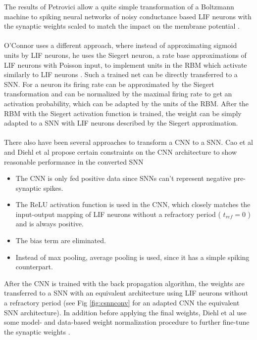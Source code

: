 The results of Petrovici allow a quite simple transformation of a Boltzmann machine to spiking neural networks of noisy conductance based LIF neurons with the synaptic weights scaled to match the impact on the membrane potential \cite{Petrovici2016}.
\\
\\
O'Connor uses a different approach, where instead of approximating sigmoid units by LIF neurons, he uses the Siegert neuron, a rate base approximations of LIF neurons with Poisson input, to implement units in the RBM which activate similarly to LIF neurons \cite{OConnor2013}. 
Such a trained net can be directly transferred to a SNN.
For a neuron its firing rate can be approximated by the Siegert transformation and can be normalized by the maximal firing rate to get an activation probability, which can be adapted by the units of the RBM. 
After the RBM with the Siegert activation function is trained, the weight can be simply adapted to a SNN with LIF neurons described by the Siegert approximation.
\\
\\
There also have been several approaches to transform a CNN to a SNN.  
Cao et al and Diehl et al propose certain constraints on the CNN architecture to show reasonable performance in the converted SNN \cite{Cao2014}\cite{Diehl2015}
\begin{itemize}
\item The CNN is only fed positive data since SNNs can't represent negative pre-synaptic spikes. 
\item The ReLU activation function is used in the CNN, which closely matches the input-output mapping of LIF neurons without a refractory period ( $t_{ref}=0$ ) and is always positive.
\item The bias term are eliminated.
\item Instead of max pooling, average pooling is used, since it has a simple spiking counterpart.
\end{itemize}
After the CNN is trained with the back propagation algorithm, the weights are transferred to a SNN with an equivalent architecture using LIF neurons without a refractory period (see Fig \ref{fig:csnnconv} for an adapted CNN the equivalent SNN architecture). 
In addition before applying the final weights, Diehl et al use some model- and data-based weight normalization procedure to further fine-tune the synaptic weights \cite{Diehl2015}. 

